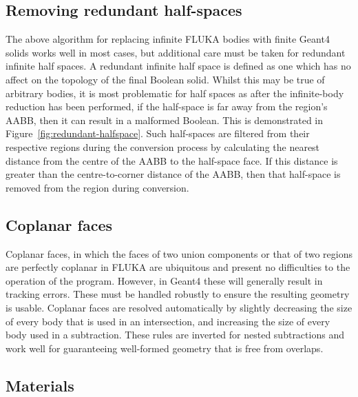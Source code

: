 \documentclass[final,5p,times,twocolumn]{elsarticle}
\begin{document}
\subsection{Removing redundant half-spaces}
The above algorithm for replacing infinite FLUKA bodies with finite
Geant4 solids works well in most cases, but additional care must be
taken for redundant infinite half spaces.  A redundant infinite half
space is defined as one which has no affect on the topology of the
final Boolean solid.  Whilst this may be true of arbitrary bodies, it
is most problematic for half spaces as after the infinite-body
reduction has been performed, if the half-space is far away from the
region's AABB, then it can result in a malformed Boolean.  This is
demonstrated in Figure~\ref{fig:redundant-halfspace}.  Such
half-spaces are filtered from their respective regions during the
conversion process by calculating the nearest distance from the centre
of the AABB to the half-space face.  If this distance is greater than
the centre-to-corner distance of the AABB, then that half-space is
removed from the region during conversion.

\subsection{Coplanar faces}
Coplanar faces, in which the faces of two union components or that of
two regions are perfectly coplanar in FLUKA are ubiquitous and present
no difficulties to the operation of the program.  However, in Geant4
these will generally result in tracking errors.  These must be handled
robustly to ensure the resulting geometry is usable.  Coplanar faces
are resolved automatically by slightly decreasing the size of every
body that is used in an intersection, and increasing the size of every
body used in a subtraction.  These rules are inverted for nested
subtractions and work well for guaranteeing well-formed geometry that
is free from overlaps.

\subsection{Materials}
\end{document}
